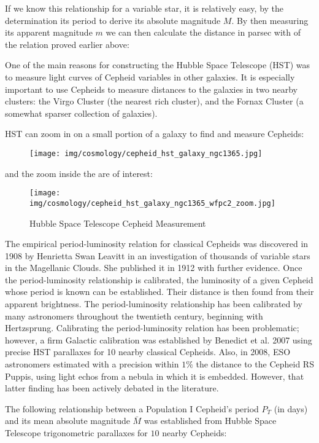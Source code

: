 	If we know this relationship for a variable star, it is relatively easy, by the determination its period to derive its absolute magnitude $M$. By then measuring its apparent magnitude $m$ we can then calculate the distance in parsec with of the relation proved earlier above:
	
	
	One of the main reasons for constructing the Hubble Space Telescope (HST) was to measure light curves of Cepheid variables in other galaxies. It is especially important to use Cepheids to measure distances to the galaxies in two nearby clusters: the Virgo Cluster (the nearest rich cluster), and the Fornax Cluster (a somewhat sparser collection of galaxies).

	HST can zoom in on a small portion of a galaxy to find and measure Cepheids:
	\begin{figure}[H]
		\centering
		\texttt{[image: img/cosmology/cepheid\_hst\_galaxy\_ngc1365.jpg]}
	\end{figure}
	and the zoom inside the are of interest:
	\begin{figure}[H]
		\centering
		\texttt{[image: img/cosmology/cepheid\_hst\_galaxy\_ngc1365\_wfpc2\_zoom.jpg]}
		\caption{Hubble Space Telescope Cepheid Measurement}
	\end{figure}
	The empirical period-luminosity relation for classical Cepheids was discovered in 1908 by Henrietta Swan Leavitt in an investigation of thousands of variable stars in the Magellanic Clouds. She published it in 1912 with further evidence. Once the period-luminosity relationship is calibrated, the luminosity of a given Cepheid whose period is known can be established. Their distance is then found from their apparent brightness. The period-luminosity relationship has been calibrated by many astronomers throughout the twentieth century, beginning with Hertzsprung. Calibrating the period-luminosity relation has been problematic; however, a firm Galactic calibration was established by Benedict et al. 2007 using precise HST parallaxes for 10 nearby classical Cepheids. Also, in 2008, ESO astronomers estimated with a precision within $1\%$ the distance to the Cepheid RS Puppis, using light echos from a nebula in which it is embedded. However, that latter finding has been actively debated in the literature.

	The following relationship between a Population I Cepheid's period $P_T$ (in days) and its mean absolute magnitude $\bar{M}$ was established from Hubble Space Telescope trigonometric parallaxes for $10$ nearby Cepheids:
	
